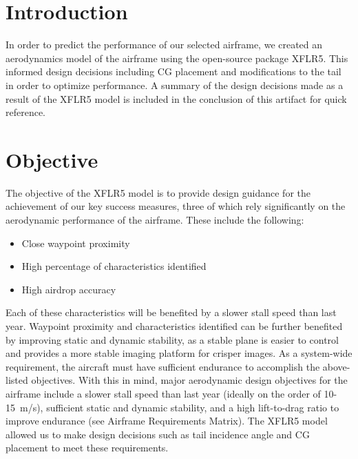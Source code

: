 \documentclass[]{auvsi_doc}
\begin{document}
\begin{AUVSITitlePage}
\begin{artifacttable}
\end{artifacttable}
\end{AUVSITitlePage}

\section{Introduction}
In order to predict the performance of our selected airframe, we created an aerodynamics model of the airframe using the open-source package XFLR5. This informed design decisions including CG placement and modifications to the tail in order to optimize performance. A summary of the design decisions made as a result of the XFLR5 model is included in the conclusion of this artifact for quick reference.

\section{Objective}
The objective of the XFLR5 model is to provide design guidance for the achievement of our key success measures, three of which rely significantly on the aerodynamic performance of the airframe. These include the following:
\begin{itemize}
	\item Close waypoint proximity
	\item High percentage of characteristics identified
	\item High airdrop accuracy
\end{itemize}
Each of these characteristics will be benefited by a slower stall speed than last year. Waypoint proximity and characteristics identified can be further benefited by improving static and dynamic stability, as a stable plane is easier to control and provides a more stable imaging platform for crisper images. As a system-wide requirement, the aircraft must have sufficient endurance to accomplish the above-listed objectives. With this in mind, major aerodynamic design objectives for the airframe include a slower stall speed than last year (ideally on the order of 10-15~m/s), sufficient static and dynamic stability, and a high lift-to-drag ratio to improve endurance (see Airframe Requirements Matrix). The XFLR5 model allowed us to make design decisions such as tail incidence angle and CG placement to meet these requirements.
\end{document}
